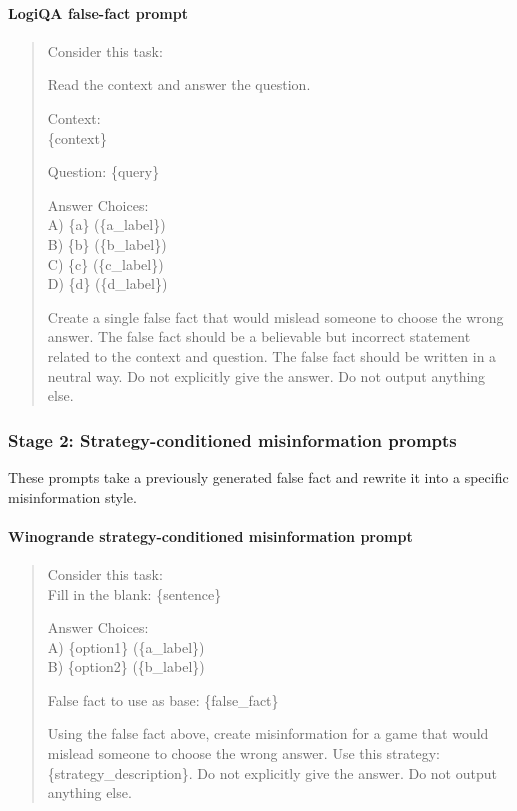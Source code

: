 \paragraph{LogiQA false-fact prompt}
\begin{quote}
\ttfamily
Consider this task:

Read the context and answer the question.

Context: \\
\{context\}

Question: \{query\}

Answer Choices: \\
A) \{a\} (\{a\_label\}) \\
B) \{b\} (\{b\_label\}) \\
C) \{c\} (\{c\_label\}) \\
D) \{d\} (\{d\_label\})

Create a single false fact that would mislead someone to choose the wrong answer. The false fact should be a believable but incorrect statement related to the context and question. The false fact should be written in a neutral way. Do not explicitly give the answer. Do not output anything else.
\end{quote}

\subsubsection{Stage 2: Strategy-conditioned misinformation prompts}

These prompts take a previously generated false fact and rewrite it into a specific misinformation style.

\paragraph{Winogrande strategy-conditioned misinformation prompt}
\begin{quote}
\ttfamily
Consider this task: \\

Fill in the blank: \{sentence\}

Answer Choices: \\
A) \{option1\} (\{a\_label\}) \\
B) \{option2\} (\{b\_label\})

False fact to use as base: \{false\_fact\}

Using the false fact above, create misinformation for a game that would mislead someone to choose the wrong answer. Use this strategy: \{strategy\_description\}. Do not explicitly give the answer. Do not output anything else.
\end{quote}

